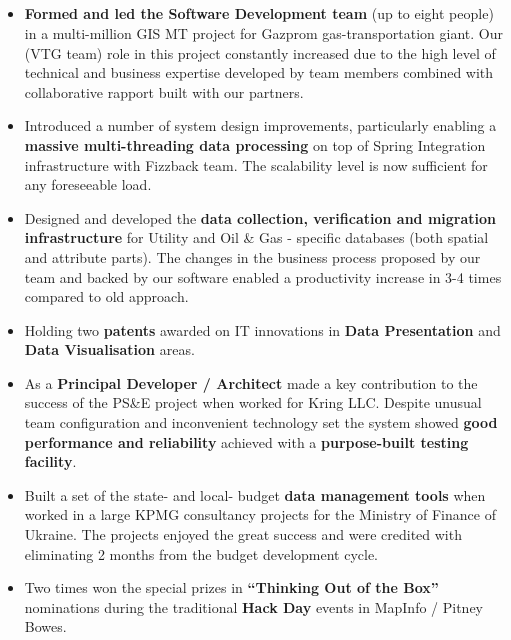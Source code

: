\documentclass{res}
\newcommand{\emp}[1]{{\bf#1}}
\newcommand{\osection}[1]{\section{\sc {\Large \textbf{#1}\\}} \vspace{0.30cm}}
\begin{document}
\begin{resume}
\osection{Career Highlights}
\begin{itemize}
\item \emp{Formed and led the Software Development team} (up to eight people) in a multi-million GIS MT project for Gazprom gas-transportation giant. Our (VTG team) role in this project constantly increased due to the high level of technical and business expertise developed by team members combined with collaborative rapport built with our partners.
\item Introduced a number of system design improvements, particularly enabling a \emp{massive multi-threading data processing} on top of Spring Integration infrastructure with Fizzback team. The scalability level is now sufficient for any foreseeable load.
\item Designed and developed the \emp{data collection, verification and migration infrastructure} for Utility and Oil \& Gas - specific databases (both spatial and attribute parts). The changes in the business process proposed by our team and backed by our software enabled a productivity increase in 3-4 times compared to old approach.
\item Holding two \emp{patents} awarded on IT innovations in \emp{Data Presentation} and \emp{Data Visualisation} areas.
\item As a \emp{Principal Developer / Architect} made a key contribution to the success of the PS\&E project when worked for Kring LLC. Despite unusual team configuration and inconvenient technology set the system showed \emp{good performance and reliability} achieved with a \emp{purpose-built testing facility}.
\item Built a set of the state- and local- budget \emp{data management tools} when worked in a large KPMG consultancy projects for the Ministry of Finance of Ukraine. The projects enjoyed the great success and were credited with eliminating 2 months from the budget development cycle.
\item Two times won the special prizes in \emp{``Thinking Out of the Box''} nominations during the traditional \emp{Hack Day} events in MapInfo / Pitney Bowes.
\end{itemize}


\end{resume}
\end{document}
